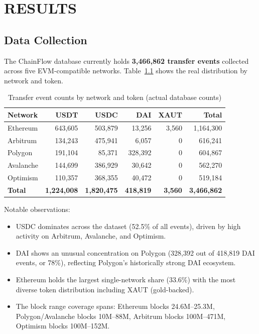 \documentclass[a4paper,12pt]{report}
\begin{document}
\chapter{RESULTS}

\section{Data Collection}

The ChainFlow database currently holds \textbf{3,466,862 transfer events} collected across five
EVM-compatible networks. Table~\ref{tab:network_token} shows the real distribution by network
and token.

\begin{table}[H]
\centering
\caption{Transfer event counts by network and token (actual database counts)}
\label{tab:network_token}
\begin{tabular}{|l|r|r|r|r|r|}
\hline
\textbf{Network} & \textbf{USDT} & \textbf{USDC} & \textbf{DAI} & \textbf{XAUT} & \textbf{Total} \\\hline
Ethereum   & 643,605 & 503,879 & 13,256 & 3,560 & 1,164,300 \\\hline
Arbitrum   & 134,243 & 475,941 &  6,057 &     0 &   616,241 \\\hline
Polygon    & 191,104 &  85,371 & 328,392 &    0 &   604,867 \\\hline
Avalanche  & 144,699 & 386,929 &  30,642 &    0 &   562,270 \\\hline
Optimism   & 110,357 & 368,355 &  40,472 &    0 &   519,184 \\\hline
\textbf{Total} & \textbf{1,224,008} & \textbf{1,820,475} & \textbf{418,819} & \textbf{3,560} & \textbf{3,466,862} \\\hline
\end{tabular}
\end{table}

Notable observations:
\begin{itemize}
\item USDC dominates across the dataset (52.5\% of all events), driven by high activity on
Arbitrum, Avalanche, and Optimism.
\item DAI shows an unusual concentration on Polygon (328,392 out of 418,819 DAI events, or 78\%),
reflecting Polygon's historically strong DAI ecosystem.
\item Ethereum holds the largest single-network share (33.6\%) with the most diverse token
distribution including XAUT (gold-backed).
\item The block range coverage spans: Ethereum blocks 24.6M--25.3M, Polygon/Avalanche blocks
10M--88M, Arbitrum blocks 100M--471M, Optimism blocks 100M--152M.
\end{itemize}
\end{document}
